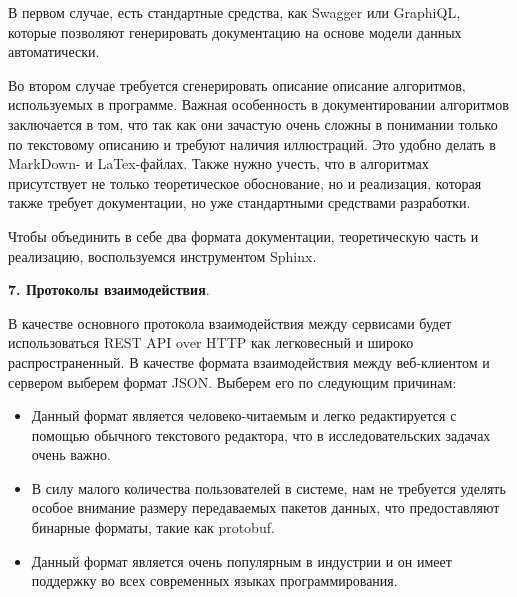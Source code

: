 В первом случае, есть стандартные средства, как Swagger или GraphiQL,
которые позволяют генерировать документацию на основе модели данных автоматически.

Во втором случае требуется сгенерировать описание описание алгоритмов, используемых в программе.
Важная особенность в документировании алгоритмов заключается в том, что так как они зачастую очень сложны
в понимании только по текстовому описанию и требуют наличия иллюстраций. Это удобно делать в MarkDown- и LaTex-файлах.
Также нужно учесть, что в алгоритмах присутствует не только теоретическое обоснование, но и реализация, которая также
требует документации, но уже стандартными средствами разработки.

Чтобы объединить в себе два формата документации, теоретическую часть и реализацию,
воспользуемся инструментом Sphinx\cite{Sphinx}.

\noindent \textbf{7. Протоколы взаимодействия}.

В качестве основного протокола взаимодействия между сервисами будет использоваться
REST API over HTTP как легковесный и широко распространенный.
В качестве формата взаимодействия между веб-клиентом и сервером выберем формат JSON. Выберем его по следующим причинам:
\begin{itemize}
    \item Данный формат является человеко-читаемым и легко редактируется с помощью обычного текстового редактора,
    что в исследовательских задачах очень важно.
    \item В силу малого количества пользователей в системе, нам не требуется уделять особое внимание размеру
    передаваемых пакетов данных, что предоставляют бинарные форматы, такие как protobuf\cite{Protobuf}.
    \item Данный формат является очень популярным в индустрии и он имеет поддержку
    во всех современных языках программирования.
\end{itemize}



